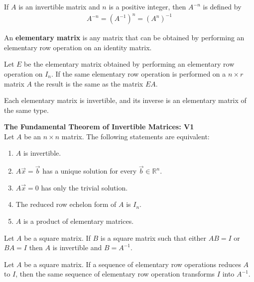 \documentclass{article}
\begin{document}
\begin{definition}
	If $A$ is an invertible matrix and $n$ is a positive integer, then $A^{-n}$ is defined by
	\begin{gather*}
		A^{-n} = (A^{-1})^n = (A^n)^{-1}
	\end{gather*}
\end{definition}
\begin{definition}
	An \textbf{elementary matrix} is any matrix that can be obtained by performing an elementary row operation on an identity matrix.
\end{definition}
\begin{theorem}
	Let $E$ be the elementary matrix obtained by performing an elementary row operation on $I_n$. If the same elementary row operation is performed on a $n\times r$ matrix $A$ the result is the same as the matrix $EA$.
\end{theorem}
\begin{theorem}
	Each elementary matrix is invertible, and its inverse is an elementary matrix of the same type.
\end{theorem}
\begin{theorem}
	\textbf{The Fundamental Theorem of Invertible Matrices: V1}\\
	Let $A$ be an $n\times n$ matrix. The following statements are equivalent:
	\begin{enumerate}
		\item $A$ is invertible.
		\item $A\vec x = \vec b$ has a unique solution for every $\vec b\in\mathbb{R}^n$.
		\item $A\vec x = 0$ has only the trivial solution.
		\item The reduced row echelon form of $A$ is $I_n$.
		\item $A$ is a product of elementary matrices.
	\end{enumerate}
\end{theorem}
\begin{theorem}
	Let $A$ be a square matrix. If $B$ is a square matrix such that either $AB=I$ or $BA=I$ then $A$ is invertible and $B=A^{-1}$.
\end{theorem}
\begin{theorem}
	Let $A$ be a square matrix. If a sequence of elementary row operations reduces $A$ to $I$, then the same sequence of elementary row operation transforms $I$ into $A^{-1}$.
\end{theorem}
\end{document}
